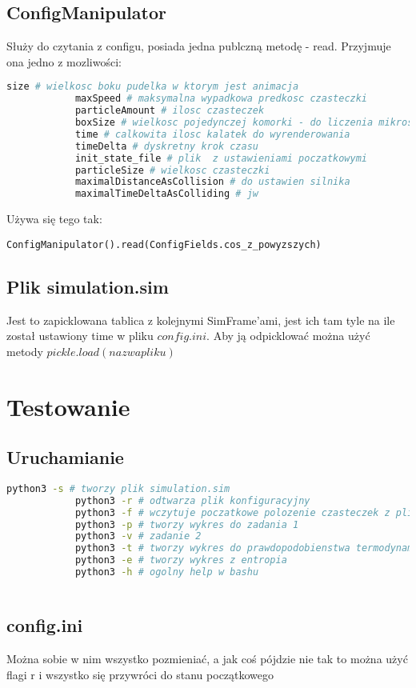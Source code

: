 \documentclass[]{article}
\begin{document}
	\subsection{ConfigManipulator}
		Służy do czytania z configu, posiada jedna publczną metodę - read. Przyjmuje ona jedno z mozliwości:
		\begin{lstlisting}[language=Python, gobble = 20]
			size # wielkosc boku pudelka w ktorym jest animacja
			maxSpeed # maksymalna wypadkowa predkosc czasteczki 
			particleAmount # ilosc czasteczek
			boxSize # wielkosc pojedynczej komorki - do liczenia mikrostanow, entropii itd.
			time # calkowita ilosc kalatek do wyrenderowania
			timeDelta # dyskretny krok czasu
			init_state_file # plik  z ustawieniami poczatkowymi
			particleSize # wielkosc czasteczki
			maximalDistanceAsCollision # do ustawien silnika
			maximalTimeDeltaAsColliding # jw
		\end{lstlisting}
		Używa się tego tak:
		\begin{lstlisting}[gobble = 20]
			ConfigManipulator().read(ConfigFields.cos_z_powyzszych)
		\end{lstlisting}
		
	\subsection{Plik simulation.sim}
		Jest to zapicklowana tablica z kolejnymi SimFrame'ami, jest ich tam tyle na ile został ustawiony time w pliku $config.ini$. Aby ją odpicklować można użyć metody $pickle.load(nazwa pliku)$
\pagebreak

\section{Testowanie}
	\subsection{Uruchamianie}
		\begin{lstlisting}[language=bash, gobble=20]
			python3 -s # tworzy plik simulation.sim
			python3 -r # odtwarza plik konfiguracyjny
			python3 -f # wczytuje poczatkowe polozenie czasteczek z pliku
			python3 -p # tworzy wykres do zadania 1
			python3 -v # zadanie 2
			python3 -t # tworzy wykres do prawdopodobienstwa termodynamicznego
			python3 -e # tworzy wykres z entropia
			python3 -h # ogolny help w bashu
			
		\end{lstlisting}
	\subsection{config.ini}
		Można sobie w nim wszystko pozmieniać, a jak coś pójdzie nie tak to można użyć flagi r i wszystko się przywróci do stanu początkowego
		
\end{document}
